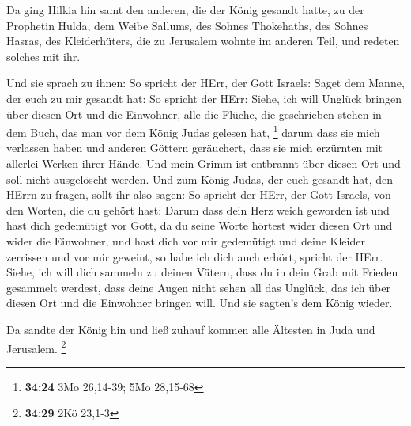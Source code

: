  Da ging Hilkia hin samt den anderen, die der König gesandt
hatte, zu der Prophetin Hulda, dem Weibe Sallums, des Sohnes Thokehaths,
des Sohnes Hasras, des Kleiderhüters, die zu Jerusalem wohnte im anderen
Teil, und redeten solches mit ihr.

 Und sie sprach zu ihnen: So spricht der HErr, der Gott
Israels: Saget dem Manne, der euch zu mir gesandt hat:  So
spricht der HErr: Siehe, ich will Unglück bringen über diesen Ort und
die Einwohner, alle die Flüche, die geschrieben stehen in dem Buch, das
man vor dem König Judas gelesen hat, \footnote{\textbf{34:24} 3Mo
  26,14-39; 5Mo 28,15-68}  darum dass sie mich verlassen
haben und anderen Göttern geräuchert, dass sie mich erzürnten mit
allerlei Werken ihrer Hände. Und mein Grimm ist entbrannt über diesen
Ort und soll nicht ausgelöscht werden.  Und zum König
Judas, der euch gesandt hat, den HErrn zu fragen, sollt ihr also sagen:
So spricht der HErr, der Gott Israels, von den Worten, die du gehört
hast:  Darum dass dein Herz weich geworden ist und hast
dich gedemütigt vor Gott, da du seine Worte hörtest wider diesen Ort und
wider die Einwohner, und hast dich vor mir gedemütigt und deine Kleider
zerrissen und vor mir geweint, so habe ich dich auch erhört, spricht der
HErr.  Siehe, ich will dich sammeln zu deinen Vätern, dass
du in dein Grab mit Frieden gesammelt werdest, dass deine Augen nicht
sehen all das Unglück, das ich über diesen Ort und die Einwohner bringen
will. Und sie sagten's dem König wieder.

 Da sandte der König hin und ließ zuhauf kommen alle
Ältesten in Juda und Jerusalem. \footnote{\textbf{34:29} 2Kö 23,1-3}

